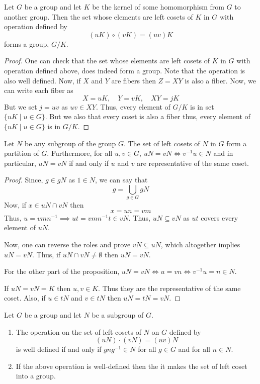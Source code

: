 \begin{theorem}
    Let $G$ be a group and let $K$ be the kernel of some homomorphism from $G$ to another group. Then the set whose elements are left
    cosets of $K$ in $G$ with operation defined by
    \[ (uK) \circ (vK) = (uv)K \]
    forms a group, $G/K$.
\end{theorem}

\begin{proof}
One can check that the set whose elements are left cosets of $K$ in $G$ with operation defined above, does indeed form a group. 
Note that the operation is also well defined.
Now, if $X$ and $Y$ are fibers then $Z=XY$ is also a fiber. Now, we can write each fiber as 
\[ X=uK, \quad Y=vK, \quad XY = jK \]
But we set $j=uv$ as $uv \in XY$. Thus, every element of $G/K$ is in set $\{uK \mid u \in G\}$. But we also that 
every coset is also a fiber thus, every element of $\{uK \mid u \in G\}$ is in $G/K$.
\end{proof}

\begin{proposition}
    Let $N$ be any subgroup of the group $G$. The set of left cosets of $N$ in $G$ form a partition of $G$. Furthermore, for all
    $u,v \in G$, $uN=vN \iff v^{-1}u \in N$ and in particular, $uN=vN$ if and only if $u$ and $v$ are representative of the same coset. 
\end{proposition}

\begin{proof}
    Since, $g \in gN$ as $1 \in N$, we can say that
    \[ g = \bigcup_{g \in G} gN \]
    Now, if $x \in uN \cap vN$ then 
    \[ x = un = vm \]
    Thus, $u=vmn^{-1} \implies ut = vmn^{-1}t \in vN$. Thus, $uN \subseteq vN$ as $ut$ covers every element of $uN$. 
    
    Now, one can reverse the roles and prove $vN \subseteq uN$, which altogether implies $uN=vN$. Thus, if $uN \cap vN \neq \emptyset$ then
    $uN=vN$.

    For the other part of the proposition, $uN = vN \iff u = vn \iff v^{-1}u = n \in N$.

    If $uN = vN = K$ then $u,v \in K$. Thus they are the representative of the same coset. Also, if
    $u \in tN$ and $v \in tN$ then $uN=tN=vN$.
\end{proof}

\begin{proposition}
    Let $G$ be a group and let $N$ be a subgroup of $G$.
    \begin{enumerate}
        \item The operation on the set of left cosets of $N$ on $G$ defined by 
        \[ (uN) \cdot (vN) = (uv) N \]
        is well defined if and only if $gng^{-1} \in N$ for all $g \in G$ and for all $n \in N$.
        \item If the above operation is well-defined then the it makes the set of left coset into a group.
    \end{enumerate} 
\end{proposition}

